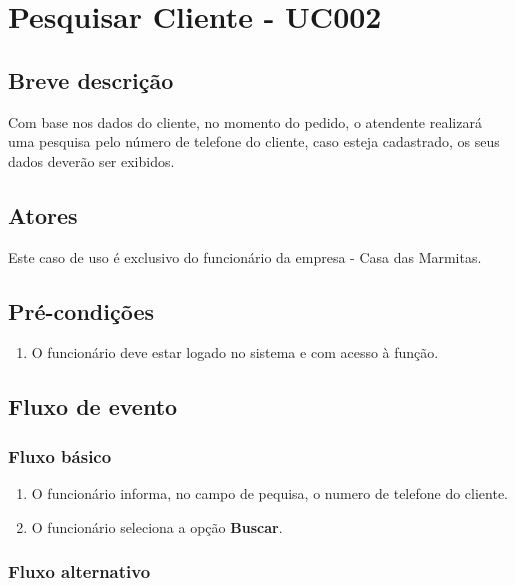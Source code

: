 \chapter{Pesquisar Cliente - UC002} \label{uc002}

\section{Breve descrição}

Com base nos dados do cliente, no momento do pedido, o atendente realizará uma pesquisa pelo número de telefone do cliente, caso esteja cadastrado, os seus dados deverão ser exibidos.

\section{Atores}

Este caso de uso é exclusivo do funcionário da empresa - Casa das Marmitas.

\section{Pré-condições}

\begin{enumerate}
	\item O funcionário deve estar logado no sistema e com acesso à função.
\end{enumerate}

\section{Fluxo de evento}

\subsection{Fluxo básico}

\begin{enumerate}
	\item O funcionário informa, no campo de pequisa, o numero de telefone do cliente.	
	\item O funcionário seleciona a opção \textbf{Buscar}.
\end{enumerate}

\subsection{Fluxo alternativo}


